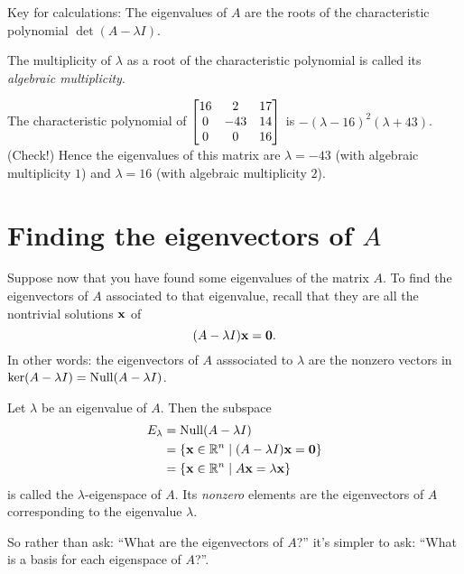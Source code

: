  Key for calculations:
The eigenvalues of $A$ are the roots of the characteristic polynomial 
$\det( A-\lambda I )$.  

\begin{definition}\label{def:algmult}
The multiplicity of $\lambda$ as a root of the characteristic polynomial
is called its \emph{algebraic multiplicity}.
\end{definition}
 
\begin{myexample}
The characteristic polynomial of $\left[ \begin{matrix} 16& 2 & 17 \\ 0 & -43 & 14\\ 0 & 0 & 16 \end{matrix} \right]$
is $-(\lambda - 16)^2(\lambda + 43)$. (Check!)  Hence the eigenvalues of this
matrix are $\lambda = -43$ (with algebraic multiplicity $1$) and
$\lambda = 16$ (with algebraic multiplicity $2$).
\end{myexample}

\section{Finding the eigenvectors of $A$}

Suppose now that you have found some eigenvalues of the
matrix $A$.  To find the eigenvectors of $A$ associated
to that eigenvalue, recall that they are all the nontrivial
solutions $\mathbf{x}$ of
$$
( A- \lambda I) \mathbf{x} = \mathbf{0}.
$$
In other words: the eigenvectors of $A$ asssociated to $\lambda$
are the nonzero vectors in $\ker( A- \lambda I)= \operatorname{Null}( A- \lambda I)$.

\begin{definition}
Let $\lambda$ be an eigenvalue of $A$.  Then the subspace
\begin{align*}
E_\lambda &= \operatorname{Null}(A- \lambda I)\\
&= \{ \mathbf{x} \in \mathbb{R}^n \mid (A- \lambda I)\mathbf{x} = \mathbf{0} \} \\
& = \{ \mathbf{x} \in \mathbb{R}^n \mid A\mathbf{x} = \lambda \mathbf{x} \}
\end{align*}
is called the $\lambda$-eigenspace of $A$.
Its {\it nonzero} elements are the eigenvectors of $A$ corresponding
to the eigenvalue $\lambda$.
\end{definition}

So rather than ask: ``What are the eigenvectors of $A$?'' it's
simpler to ask: ``What is a basis for each eigenspace of $A$?''.

